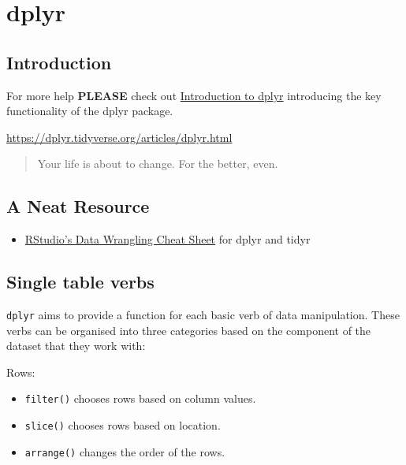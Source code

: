 \documentclass[
]{book}
\providecommand{\tightlist}{%
  \setlength{\itemsep}{0pt}\setlength{\parskip}{0pt}}
\begin{document}
\hypertarget{dplyr}{%
\chapter{dplyr}\label{dplyr}}

\hypertarget{introduction-3}{%
\section{Introduction}\label{introduction-3}}

For more help \textbf{PLEASE} check out \href{https://dplyr.tidyverse.org/articles/dplyr.html}{Introduction to dplyr} introducing the key functionality of the dplyr package.

\url{https://dplyr.tidyverse.org/articles/dplyr.html}

\begin{quote}
Your life is about to change. For the better, even.
\end{quote}

\hypertarget{a-neat-resource}{%
\section{A Neat Resource}\label{a-neat-resource}}

\begin{itemize}
\tightlist
\item
  \href{http://www.rstudio.com/wp-content/uploads/2015/02/data-wrangling-cheatsheet.pdf}{RStudio's Data Wrangling Cheat Sheet} for dplyr and tidyr
\end{itemize}

\hypertarget{single-table-verbs}{%
\section{Single table verbs}\label{single-table-verbs}}

\texttt{dplyr} aims to provide a function for each basic verb of data manipulation. These verbs can be organised into three categories based on the component of the dataset that they work with:

Rows:

\begin{itemize}
\tightlist
\item
  \texttt{filter()} chooses rows based on column values.
\item
  \texttt{slice()} chooses rows based on location.
\item
  \texttt{arrange()} changes the order of the rows.
\end{itemize}
\end{document}
